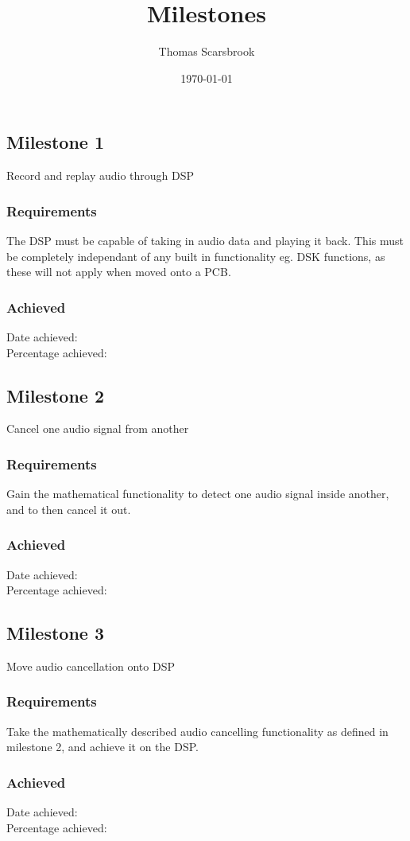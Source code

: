 \documentclass[a4paper, 12pt]{memoir}
\author{Thomas Scarsbrook}
\date{\today}
\title{Milestones}
\begin{document}
\maketitle

\subsection{Milestone 1}
Record and replay audio through DSP
\subsubsection{Requirements}
The DSP must be capable of taking in audio data and playing it back.
This must be completely independant of any built in functionality eg. DSK functions, as these will not apply when moved onto a PCB.
\subsubsection{Achieved}
Date achieved:		\\
Percentage achieved:


\subsection{Milestone 2}
Cancel one audio signal from another
\subsubsection{Requirements}
Gain the mathematical functionality to detect one audio signal inside another, and to then cancel it out.
\subsubsection{Achieved}
Date achieved:		\\
Percentage achieved:

\subsection{Milestone 3}
Move audio cancellation onto DSP
\subsubsection{Requirements}
Take the mathematically described audio cancelling functionality as defined in milestone 2, and achieve it on the DSP.
\subsubsection{Achieved}
Date achieved:		\\
Percentage achieved:	\\
\end{document}
